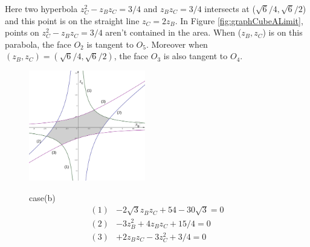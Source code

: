 \documentclass[suppldata, dvipdfmx]{interact}
\theoremstyle{plain}%
\theoremstyle{definition}
\theoremstyle{remark}
\theoremstyle{problemstyle}
\begin{document}
Here two hyperbola $z^2_C - z_Bz_C = 3/4$ and $z_B z_C = 3/4$ intersects
at ($\sqrt{6} / 4, \sqrt{6}/2$) and this point is on the straight line
$z_C=2z_B$. In Figure \ref{fig:graphCubeALimit}, points on $z^2_C - z_Bz_C = 3/4$ aren't
contained in the area. When ($z_B, z_C$) is on this parabola, the face
$O_2$ is tangent to $O_5$. Moreover when
$(z_B, z_C) = (\sqrt{6} / 4, \sqrt{6}/2)$, the face $O_3$ is also tangent
to $O_4$.

\begin{figure}[h!tbp]
 \begin{minipage}[]{0.5\textwidth}
 \centering
 \includegraphics[width=2in,
 keepaspectratio]{./img/graph/cubeB.png}
 \caption{}
 \label{fig:graphCubeB}
 \end{minipage}
 \hspace*{\fill}
 \begin{minipage}[]{0.5\textwidth}
  case(b)
  \centering
  \begin{align*}
   (1)& -2\sqrt{3} z_B z_C + 54 - 30\sqrt{3} = 0\\
   (2)& -3z_B^2 + 4 z_B z_C + 15/4 = 0\\
   (3)& +2z_B z_C - 3z_C^2 + 3/4 = 0
  \end{align*}
 \end{minipage}
\end{figure}
\end{document}

